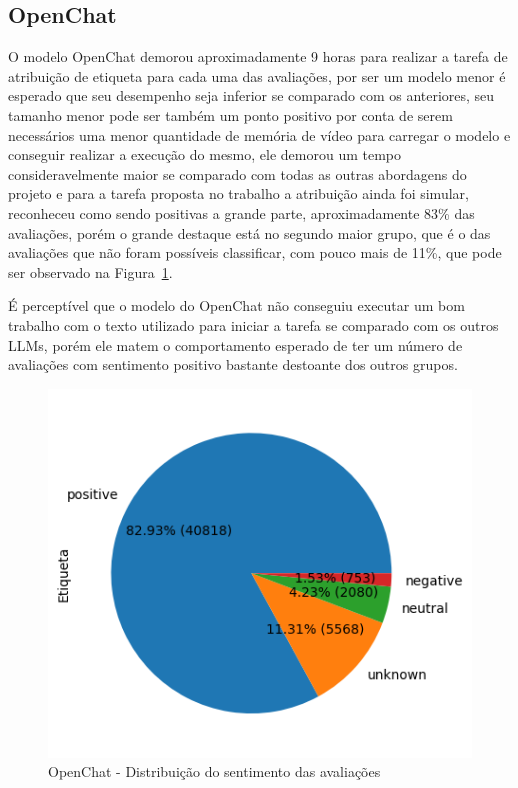 \subsection{OpenChat}
\label{sec:resultados:subsec:openchat}

O modelo OpenChat demorou aproximadamente 9 horas para realizar a tarefa de atribuição de etiqueta para cada uma das avaliações, por ser um modelo menor é esperado que seu desempenho seja inferior se comparado com os anteriores, seu tamanho menor pode ser também um ponto positivo por conta de serem necessários uma menor quantidade de memória de vídeo para carregar o modelo e conseguir realizar a execução do mesmo, ele demorou um tempo consideravelmente maior se comparado com todas as outras abordagens do projeto e para a tarefa proposta no trabalho a atribuição ainda foi simular, reconheceu como sendo positivas a grande parte, aproximadamente 83\% das avaliações, porém o grande destaque está no segundo maior grupo, que é o das avaliações que não foram possíveis classificar, com pouco mais de 11\%, que pode ser observado na Figura~\ref{img:openchat_pizza_distribuicao}.

É perceptível que o modelo do OpenChat não conseguiu executar um bom trabalho com o texto utilizado para iniciar a tarefa se comparado com os outros LLMs, porém ele matem o comportamento esperado de ter um número de avaliações com sentimento positivo bastante destoante dos outros grupos.

\begin{figure}
	\centering
	\includegraphics{figs/openchat/distribuicao_pizza.png}
	\caption{OpenChat - Distribuição do sentimento das avaliações}
	\label{img:openchat_pizza_distribuicao}
\end{figure}

